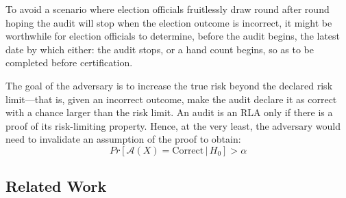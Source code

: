 To avoid a scenario where election officials fruitlessly draw round after round hoping the audit will stop when the election outcome is incorrect, it might be worthwhile for election officials to determine, before the audit begins, the latest date by which either: the audit stops, or a hand count begins, so as to be completed before certification. 

 The goal of the adversary is to increase the true risk beyond the declared risk limit---that is, given an incorrect outcome, make the audit declare it as correct with a chance larger than the risk limit. An audit is an RLA only if there is a proof of its risk-limiting property. Hence, at the very least, the adversary would need to invalidate an assumption of the proof to obtain:  
$$
Pr[\mathcal{A}(X) 
= \text{Correct} \,|\, H_0] > \alpha
$$

\subsection{Related Work}
\label{sec:related}



